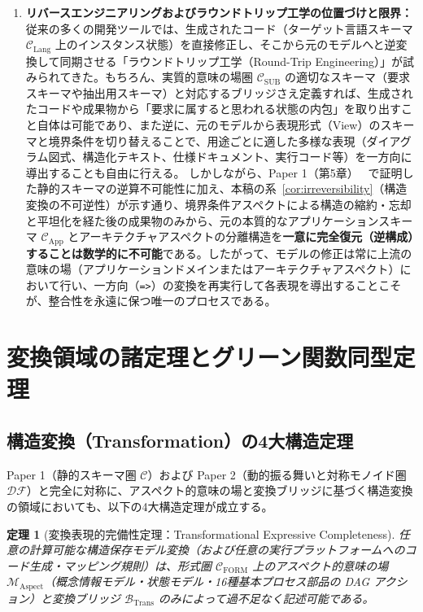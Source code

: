 \documentclass[11pt,a4paper]{ltjsarticle}
\theoremstyle{definition}
\theoremstyle{plain}
\newtheorem{theorem}{定理}[section]
\theoremstyle{remark}
\newcommand{\CFORM}{\mathcal{C}_{\mathrm{FORM}}}
\newcommand{\CSUB}{\mathcal{C}_{\mathrm{SUB}}}
\newcommand{\MAspect}{\mathcal{M}_{\mathrm{Aspect}}}
\newcommand{\BTrans}{\mathcal{B}_{\mathrm{Trans}}}
\begin{document}
\begin{enumerate}
    \item \textbf{リバースエンジニアリングおよびラウンドトリップ工学の位置づけと限界：}
    従来の多くの開発ツールでは、生成されたコード（ターゲット言語スキーマ $\mathcal{C}_{\mathrm{Lang}}$ 上のインスタンス状態）を直接修正し、そこから元のモデルへと逆変換して同期させる「ラウンドトリップ工学（Round-Trip Engineering）」が試みられてきた。もちろん、実質的意味の場圏 $\CSUB$ の適切なスキーマ（要求スキーマや抽出用スキーマ）と対応するブリッジさえ定義すれば、生成されたコードや成果物から「要求に属すると思われる状態の内包」を取り出すこと自体は可能であり、また逆に、元のモデルから表現形式（View）のスキーマと境界条件を切り替えることで、用途ごとに適した多様な表現（ダイアグラム図式、構造化テキスト、仕様ドキュメント、実行コード等）を一方向に導出することも自由に行える。
    しかしながら、Paper 1（第5章）~\cite{ota2026paper1} で証明した静的スキーマの逆算不可能性に加え、本稿の系~\ref{cor:irreversibility}（構造変換の不可逆性）が示す通り、境界条件アスペクトによる構造の縮約・忘却と平坦化を経た後の成果物のみから、元の本質的なアプリケーションスキーマ $\mathcal{C}_{\mathrm{App}}$ とアーキテクチャアスペクトの分離構造を\textbf{一意に完全復元（逆構成）することは数学的に不可能}である。したがって、モデルの修正は常に上流の意味の場（アプリケーションドメインまたはアーキテクチャアスペクト）において行い、一方向（\texttt{=>}）の変換を再実行して各表現を導出することこそが、整合性を永遠に保つ唯一のプロセスである。
\end{enumerate}

\section{変換領域の諸定理とグリーン関数同型定理}

\subsection{構造変換（Transformation）の4大構造定理}
Paper 1（静的スキーマ圏 $\mathcal{C}$）および Paper 2（動的振る舞いと対称モノイド圏 $\mathcal{DF}$）と完全に対称に、アスペクト的意味の場と変換ブリッジに基づく構造変換の領域においても、以下の4大構造定理が成立する。

\begin{theorem}[変換表現的完備性定理：Transformational Expressive Completeness]\label{thm:trans-completeness}
任意の計算可能な構造保存モデル変換（および任意の実行プラットフォームへのコード生成・マッピング規則）は、形式圏 $\CFORM$ 上のアスペクト的意味の場 $\MAspect$（概念情報モデル・状態モデル・16種基本プロセス部品の DAG アクション）と変換ブリッジ $\BTrans$ のみによって過不足なく記述可能である。
\end{theorem}
\end{document}

